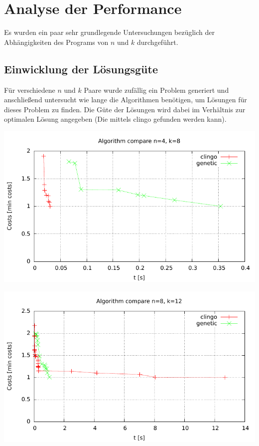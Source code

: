 \section{Analyse der Performance}

Es wurden ein paar sehr grundlegende Untersuchungen bezüglich der Abhängigkeiten des Programs von $n$ und $k$ durchgeführt.

\subsection{Einwicklung der Lösungsgüte}

Für verschiedene $n$ und $k$ Paare wurde zufällig ein Problem generiert und anschließend untersucht wie lange die Algorithmen benötigen, um Lösungen für dieses Problem zu finden. Die Güte der Lösungen wird dabei im Verhältnis zur optimalen Lösung angegeben (Die mittels clingo gefunden werden kann).

\includegraphics{../../plots/algorithmCompare-n4-k8.pdf}

\includegraphics{../../plots/algorithmCompare-n8-k12.pdf}

